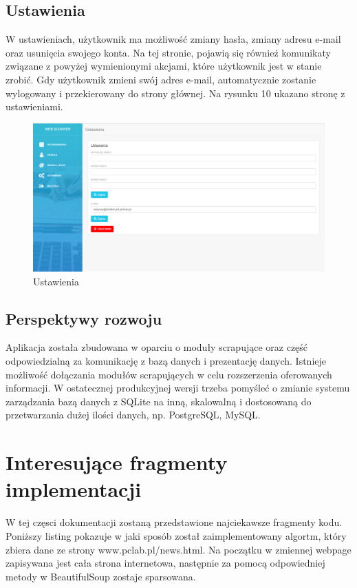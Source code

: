 \documentclass[12pt, titlepage]{article}
\begin{document}
	\subsection{Ustawienia}
	W ustawieniach, użytkownik ma możliwość zmiany hasła, zmiany adresu e-mail oraz usunięcia swojego konta. Na tej stronie, pojawią się również komunikaty związane z powyżej wymienionymi akcjami, które użytkownik jest w stanie zrobić. Gdy użytkownik zmieni swój adres e-mail, automatycznie zostanie wylogowany i przekierowany do strony głównej. Na rysunku 10 ukazano stronę z ustawieniami.
	\begin{figure}[H]
		\centering
		\includegraphics[scale=0.45]{obrazki/ustawienia.png}
		\caption{Ustawienia}
		\label{fig:db_schema}
	\end{figure}
	
	\newpage
	\subsection{Perspektywy rozwoju}
	Aplikacja została zbudowana w oparciu o moduły scrapujące oraz część odpowiedzialną za komunikację z bazą danych i prezentację danych. Istnieje możliwość dołączania modułów scrapujących w celu rozszerzenia oferowanych informacji. W ostatecznej produkcyjnej wersji trzeba pomyśleć o zmianie systemu zarządzania bazą danych z SQLite na inną, skalowalną i dostosowaną do przetwarzania dużej ilości danych, np. PostgreSQL, MySQL.
	
	\newpage
	\section{Interesujące fragmenty implementacji}
	W tej częsci dokumentacji zostaną przedstawione 
	najciekawsze fragmenty kodu. Poniższy listing pokazuje w jaki sposób został zaimplementowany algortm, który zbiera dane ze strony www.pclab.pl/news.html. Na początku w zmiennej webpage zapisywana jest cała strona internetowa, następnie za pomocą odpowiedniej metody w BeautifulSoup zostaje sparsowana.  
	
\end{document}
